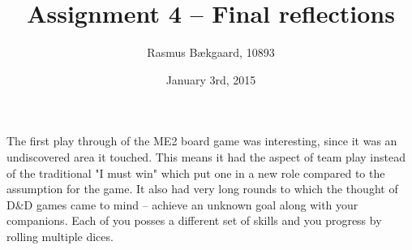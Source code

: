 \documentclass[oneside, 12pt]{article}
\title{Assignment 4 --  Final reflections}
\author{Rasmus Bækgaard, 10893}
\date{January 3rd, 2015}
\begin{document}
\maketitle

The first play through  of the ME2 board game was interesting, since it was an undiscovered area it touched. 
This means it had the aspect of team play instead of the traditional "I must win" which put one in a new role compared to the assumption for the game.
It also had very long rounds to which the thought of D\&D games came to mind -- achieve an unknown goal along with your companions. 
Each of you posses a different set of skills and you progress by rolling multiple dices. 
\end{document}

